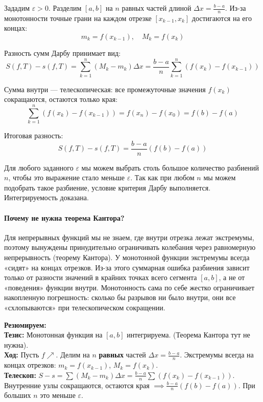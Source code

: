 Зададим $\varepsilon > 0$. Разделим $[a, b]$ на $n$ равных частей длиной $\Delta x = \frac{b-a}{n}$. 
Из-за монотонности точные грани на каждом отрезке $[x_{k-1}, x_k]$ достигаются на его концах:
$$ m_k = f(x_{k-1}), \quad M_k = f(x_k) $$

Разность сумм Дарбу принимает вид:
$$ S(f, T) - s(f, T) = \sum_{k=1}^n (M_k - m_k) \Delta x = \frac{b-a}{n} \sum_{k=1}^n (f(x_k) - f(x_{k-1})) $$

Сумма внутри — телескопическая: все промежуточные значения $f(x_k)$ сокращаются, остаются только края:
$$ \sum_{k=1}^n (f(x_k) - f(x_{k-1})) = f(x_n) - f(x_0) = f(b) - f(a) $$

Итоговая разность:
$$ S(f, T) - s(f, T) = \frac{b-a}{n} (f(b) - f(a)) $$

Для любого заданного $\varepsilon$ мы можем выбрать столь большое количество разбиений $n$, чтобы это выражение стало меньше $\varepsilon$. Так как при любом $n$ мы можем подобрать такое разбиение, условие критерия Дарбу выполняется. Интегрируемость доказана.

\paragraph{Почему не нужна теорема Кантора?}
Для непрерывных функций мы не знаем, где внутри отрезка лежат экстремумы, поэтому вынуждены принудительно ограничивать колебания через равномерную непрерывность (теорему Кантора). 
У монотонной функции экстремумы всегда «сидят» на концах отрезков. Из-за этого суммарная ошибка разбиения зависит только от разности значений в крайних точках всего сегмента $[a, b]$, а не от «поведения» функции внутри. Монотонность сама по себе жестко ограничивает накопленную погрешность: сколько бы разрывов ни было внутри, они все «схлопываются» при телескопическом сокращении.


\begin{tcolorbox}[colback=gray!5, colframe=black, boxrule=0.5pt, arc=0pt]
\textbf{Резюмируем:} \\
\textbf{Тезис:} Монотонная функция на $[a,b]$ интегрируема. (Теорема Кантора тут не нужна). \\
\textbf{Ход:} Пусть $f \nearrow$. Делим на $n$ \textbf{равных} частей $\Delta x = \frac{b-a}{n}$. Экстремумы всегда на концах отрезков: $m_k = f(x_{k-1})$, $M_k = f(x_k)$. \\
\textbf{Телескоп:} $S - s = \sum (M_k - m_k)\Delta x = \frac{b-a}{n} \sum (f(x_k) - f(x_{k-1}))$. Внутренние узлы сокращаются, остаются края $\implies \frac{b-a}{n}(f(b) - f(a))$. При больших $n$ это меньше $\varepsilon$.
\end{tcolorbox}





